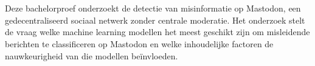 
%
%
%
%
%

%



\chapter*{}

Deze bachelorproef onderzoekt de detectie van misinformatie op Mastodon, een gedecentraliseerd sociaal netwerk zonder centrale moderatie. Het onderzoek stelt de vraag welke machine learning modellen het meest geschikt zijn om misleidende berichten te classificeren op Mastodon en welke inhoudelijke factoren de nauwkeurigheid van die modellen beïnvloeden.

